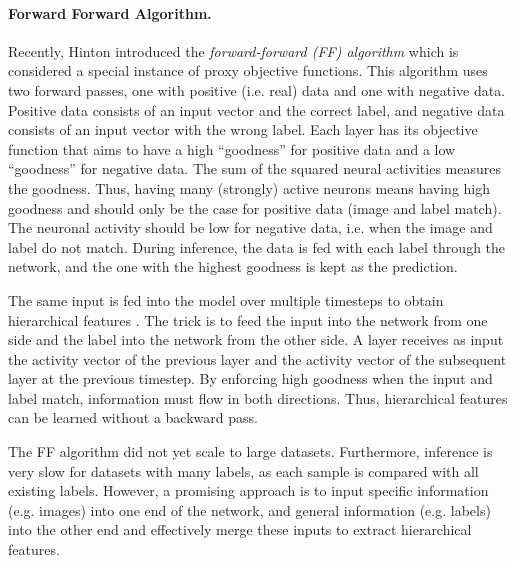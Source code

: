 \paragraph{Forward Forward Algorithm.}
Recently, Hinton  introduced the \emph{forward-forward (FF) algorithm} which is considered a special instance of proxy objective functions.
This algorithm uses two forward passes, one with positive (i.e. real) data and one with negative data.
Positive data consists of an input vector and the correct label, and negative data consists of an input vector with the wrong label.
Each layer has its objective function that aims to have a high ``goodness'' for positive data and a low ``goodness'' for negative data. 
The sum of the squared neural activities measures the goodness. Thus, having many (strongly) active neurons means having high goodness and should only be the case for positive data (image and label match). The neuronal activity should be low for negative data, i.e. when the image and label do not match.
During inference, the data is fed with each label through the network, and the one with the highest goodness is kept as the prediction.

The same input is fed into the model over multiple timesteps to obtain hierarchical features .
The trick is to feed the input into the network from one side and the label into the network from the other side. A layer receives as input the activity vector of the previous layer and the activity vector of the subsequent layer at the previous timestep. By enforcing high goodness when the input and label match, information must flow in both directions. Thus, hierarchical features can be learned without a backward pass.

The FF algorithm did not yet scale to large datasets. Furthermore, inference is very slow for datasets with many labels, as each sample is compared with all existing labels. However, a promising approach is to input specific information (e.g. images) into one end of the network, and general information (e.g. labels) into the other end and effectively merge these inputs to extract hierarchical features.

